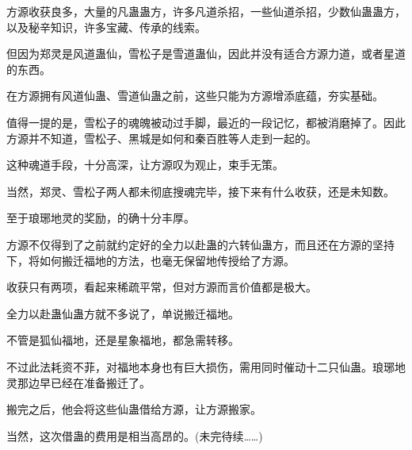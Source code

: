 \begin{this_body}
方源收获良多，大量的凡蛊蛊方，许多凡道杀招，一些仙道杀招，少数仙蛊蛊方，以及秘辛知识，许多宝藏、传承的线索。

但因为郑灵是风道蛊仙，雪松子是雪道蛊仙，因此并没有适合方源力道，或者星道的东西。

在方源拥有风道仙蛊、雪道仙蛊之前，这些只能为方源增添底蕴，夯实基础。

值得一提的是，雪松子的魂魄被动过手脚，最近的一段记忆，都被消磨掉了。因此方源并不知道，雪松子、黑城是如何和秦百胜等人走到一起的。

这种魂道手段，十分高深，让方源叹为观止，束手无策。

当然，郑灵、雪松子两人都未彻底搜魂完毕，接下来有什么收获，还是未知数。

至于琅琊地灵的奖励，的确十分丰厚。

方源不仅得到了之前就约定好的全力以赴蛊的六转仙蛊方，而且还在方源的坚持下，将如何搬迁福地的方法，也毫无保留地传授给了方源。

收获只有两项，看起来稀疏平常，但对方源而言价值都是极大。

全力以赴蛊仙蛊方就不多说了，单说搬迁福地。

不管是狐仙福地，还是星象福地，都急需转移。

不过此法耗资不菲，对福地本身也有巨大损伤，需用同时催动十二只仙蛊。琅琊地灵那边早已经在准备搬迁了。

搬完之后，他会将这些仙蛊借给方源，让方源搬家。

当然，这次借蛊的费用是相当高昂的。(未完待续……)

\end{this_body}

